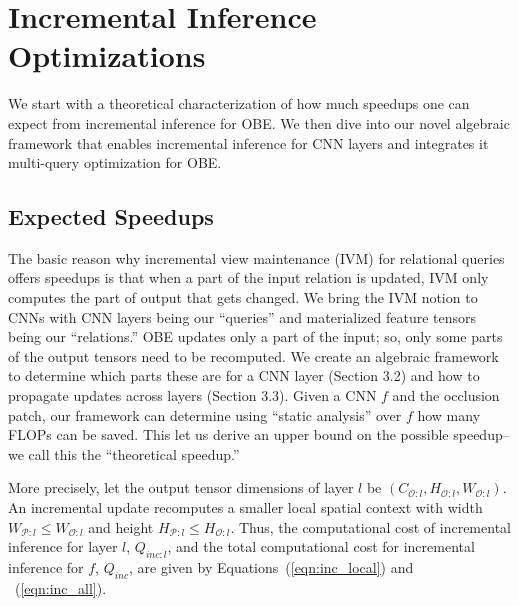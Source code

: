 \section{Incremental Inference Optimizations}\label{sec:exact}
We start with a theoretical characterization of how much speedups one can expect from incremental inference for OBE. We then dive into our novel algebraic framework that enables incremental inference for CNN layers and integrates it multi-query optimization for OBE.


\subsection{Expected Speedups}
The basic reason why incremental view maintenance (IVM) for relational queries offers speedups is that when a part of the input relation is updated, IVM only computes the part of output that gets changed. We bring the IVM notion to CNNs with CNN layers being our ``queries'' and materialized feature tensors being our ``relations.'' OBE updates only a part of the input; so, only some parts of the output tensors need to be recomputed. We create an algebraic framework to determine which parts these are for a CNN layer (Section 3.2) and how to propagate updates across layers (Section 3.3). Given a CNN $f$ and the occlusion patch, our framework can determine using ``static analysis'' over $f$ how many FLOPs can be saved. This let us derive an upper bound on the possible speedup--we call this the ``theoretical speedup.''

More precisely, let the output tensor dimensions of layer $l$ be $(C_{\mathcal{O}:l} , H_{\mathcal{O}:l} , W_{\mathcal{O}:l})$. An incremental update recomputes a smaller local spatial context with width $W_{\mathcal{P}:l} \le W_{\mathcal{O}:l}$ and height $H_{\mathcal{P}:l} \le H_{\mathcal{O}:l}$. Thus, the computational cost of incremental inference for layer $l$, $Q_{inc:l}$, and the total computational cost for incremental inference for $f$, $Q_{inc}$, are given by Equations~(\ref{eqn:inc_local}) and ~(\ref{eqn:inc_all}).


